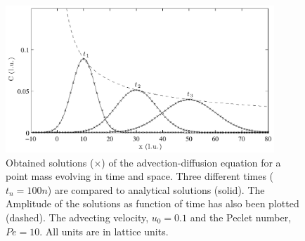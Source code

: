 \begin{figure}\label{fig:adv-dif}
\begin{center}
\includegraphics[width=0.9\textwidth]{fig/adv_dif_10_30_50.pdf}
\end{center}
\caption{Obtained solutions ($\times$) of the
  advection-diffusion equation for a point mass evolving in time and
  space. Three different times ($t_n = 100n$) are compared to
  analytical solutions (solid). The Amplitude of the solutions as
  function of time has also been plotted (dashed). The advecting
  velocity, $u_0 = 0.1$ and the Peclet number, $Pe = 10$.  All units
  are in lattice units.}
\end{figure}
